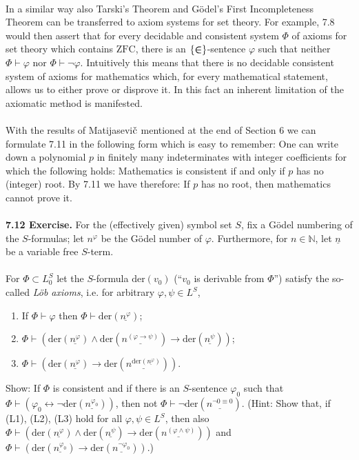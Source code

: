 \documentclass[leqno]{report}
\newcommand{\nat}{\mathbb{N}}
\newcommand{\zfc}{\mathrm{ZFC}}
\newcommand{\der}[1]{\mathrm{der}(\underline{n^{#1}})}
\newcommand{\mbf}[1]{{\mbox{\boldmath\begin{math}#1\end{math}}}}
\begin{document}
\ \\
In a similar way also Tarski's Theorem and G\"{o}del's First Incompleteness Theorem can be transferred to axiom systems for set theory. For example, 7.8 would then assert that for every decidable and consistent system $\Phi$ of axioms for set theory which contains $\zfc$, there is an $\{ \mbf{\in} \}$-sentence $\varphi$ such that neither $\Phi \vdash \varphi$ nor $\Phi \vdash \neg\varphi$. Intuitively this means that there is no decidable consistent system of axioms for mathematics which, for every mathematical statement, allows us to either prove or disprove it. In this fact an inherent limitation of the axiomatic method is manifested.\\
\ \\
With the results of Matijasevi$\check{\rm c}$ mentioned at the end of Section 6 we can formulate 7.11 in the following form which is easy to remember: One can write down a polynomial $p$ in finitely many indeterminates with integer coefficients for which the following holds: Mathematics is consistent if and only if $p$ has no (integer) root. By 7.11 we have therefore: If $p$ has no root, then mathematics cannot prove it.\\
\ \\
\textbf{7.12 Exercise.} For the (effectively given) symbol set $S$, fix a G\"{o}del numbering of the $S$-formulas; let $n^\varphi$ be the G\"{o}del number of $\varphi$. Furthermore, for $n \in \nat$, let $\underline{n}$ be a variable free $S$-term.\\
\ \\
For $\Phi \subset L^S_0$ let the $S$-formula $\mathrm{der}(v_0)$ (``$v_0$ is derivable from $\Phi$'') satisfy the so-called \emph{L\"{o}b axioms}, i.e. for arbitrary $\varphi, \psi \in L^S$,
\begin{enumerate}[(L1)]
\item If $\Phi \vdash \varphi$ then $\Phi \vdash \der{\varphi}$;
%
\item $\Phi \vdash (\der{\varphi} \land \der{(\varphi \rightarrow \psi)} \rightarrow \der{\psi})$;
%
\item $\Phi \vdash (\der{\varphi} \rightarrow \der{\der{\varphi}})$.
\end{enumerate}
Show: If $\Phi$ is consistent and if there is an $S$-sentence $\varphi_0$ such that $\Phi \vdash (\varphi_0 \leftrightarrow \neg\der{\varphi_0})$, then not $\Phi \vdash \neg\der{\neg 0 \equiv 0}$. (Hint: Show that, if (L1), (L2), (L3) hold for all $\varphi, \psi \in L^S$, then also $\Phi \vdash (\der{\varphi} \land \der{\psi} \rightarrow \der{(\varphi \land \psi)})$ and $\Phi \vdash (\der{\varphi_0} \rightarrow \der{\neg\varphi_0})$.)
\end{document}
